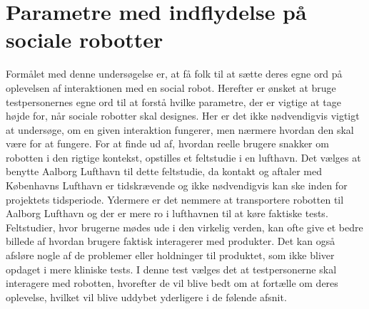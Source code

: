 	\chapter{Parametre med indflydelse på sociale robotter}
\label{ParametreSocialeRobotter}
%
Formålet med denne undersøgelse er, at få folk til at sætte deres egne ord på oplevelsen af interaktionen med en social robot. Herefter er ønsket at bruge testpersonernes egne ord til at forstå hvilke parametre, der er vigtige at tage højde for, når sociale robotter skal designes. Her er det ikke nødvendigvis vigtigt at undersøge, om en given interaktion fungerer, men nærmere hvordan den skal være for at fungere. For at finde ud af, hvordan reelle brugere snakker om robotten i den rigtige kontekst, opstilles et feltstudie i en lufthavn. Det vælges at benytte Aalborg Lufthavn til dette feltstudie, da kontakt og aftaler med Københavns Lufthavn er tidskrævende og ikke nødvendigvis kan ske inden for projektets tidsperiode. Ydermere er det nemmere at transportere robotten til Aalborg Lufthavn og der er mere ro i lufthavnen til at køre faktiske tests.\blankline
%
Feltstudier, hvor brugerne mødes ude i den virkelig verden, kan ofte give et bedre billede af hvordan brugere faktisk interagerer med produkter. Det kan også afsløre nogle af de problemer eller holdninger til produktet, som ikke bliver opdaget i mere kliniske tests. I denne test vælges det at testpersonerne skal interagere med robotten, hvorefter de vil blive bedt om at fortælle om deres oplevelse, hvilket vil blive uddybet yderligere i de følende afsnit.
